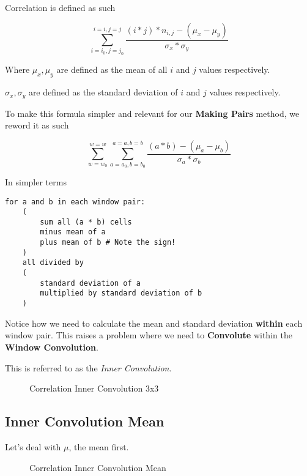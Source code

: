 \documentclass[article,oneside]{memoir}
\begin{document}
Correlation is defined as such

$$
\sum_{i=i_0,j=j_0}^{i=i,j=j}
\frac{(i * j) * n_{i,j} - (\mu_x - \mu_y)}
{\sigma_x * \sigma_y}
$$

Where $\mu_x,\mu_y$ are defined as the mean of all $i$ and $j$ values respectively.

$\sigma_x,\sigma_y$ are defined as the standard deviation of $i$ and $j$ values respectively.

To make this formula simpler and relevant for our \textbf{Making Pairs} method, we reword it as such

$$
\sum_{w=w_0}^{w=w} \sum_{a=a_0,b=b_0}^{a=a,b=b}
\frac{(a * b) - (\mu_a - \mu_b)}
{\sigma_a * \sigma_b}
$$

In simpler terms

\begin{verbatim}
for a and b in each window pair:
	(
		sum all (a * b) cells
		minus mean of a
		plus mean of b # Note the sign!
	)	
	all divided by
	(
		standard deviation of a 
		multiplied by standard deviation of b
	)
\end{verbatim}

Notice how we need to calculate the mean and standard deviation
\textbf{within} each window pair. This raises a problem where
we need to \textbf{Convolute} within the \textbf{Window Convolution}. 

This is referred to as the \textit{Inner Convolution}.

\begin{figure}[H]
\centering
{}
\caption{Correlation Inner Convolution 3x3}
\label{Correlation Inner Convolution 3x3}
\end{figure}

\subsection{Inner Convolution Mean}

Let's deal with $\mu$, the mean first.

\begin{figure}[H]
\centering
{}
\caption{Correlation Inner Convolution Mean}
\label{Correlation Inner Convolution Mean}
\end{figure}
\end{document}
